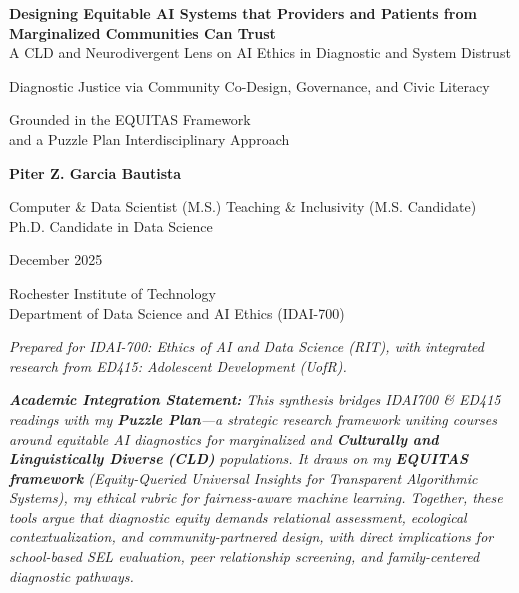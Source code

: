\documentclass[12pt,a4paper]{article}
\begin{document}
\begin{titlepage}
\centering
\vspace*{2.5cm}


{\Large \textbf{Designing Equitable AI Systems that Providers and Patients from Marginalized Communities Can Trust}}\\
{\normalsize A CLD and Neurodivergent Lens on AI Ethics in Diagnostic and System Distrust}


\vspace{1.6cm}

{\large Diagnostic Justice via Community Co-Design, Governance, and Civic Literacy}

\vspace{1.6cm}


{\normalsize Grounded in the EQUITAS Framework \\ and a Puzzle Plan Interdisciplinary Approach}


\vspace{2.4cm}


{\large \textbf{Piter Z. Garcia Bautista} \par}
{\large Computer \texorpdfstring{\&}{and} Data Scientist (M.S.) \textbullet{} Teaching \texorpdfstring{\&}{and} Inclusivity (M.S. Candidate) \textbullet{} Ph.D. Candidate in Data Science}


\vspace{0.3cm}


{\normalsize December 2025}


\vspace{2.5cm}


{\small Rochester Institute of Technology \\ Department of Data Science and AI Ethics (IDAI-700)}


\vfill

{
\scriptsize \textit{Prepared for IDAI-700: Ethics of AI and Data Science (RIT), with integrated research from ED415: Adolescent Development (UofR).} \\

\vspace{0.3cm}

\textit{\tiny\textbf{Academic Integration Statement:} This synthesis bridges IDAI700 \texorpdfstring{\&}{and} ED415 readings with my \textbf{Puzzle Plan}—a strategic research framework uniting courses around equitable AI diagnostics for marginalized and \textbf{\textit{Culturally and Linguistically Diverse}} \textbf{(CLD)} populations. It draws on my \textbf{EQUITAS framework} \textit{(Equity-Queried Universal Insights for Transparent Algorithmic Systems)}, my ethical rubric for fairness-aware machine learning. Together, these tools argue that \emph{diagnostic equity demands relational assessment, ecological contextualization, and community-partnered design}, with direct implications for school-based SEL evaluation, peer relationship screening, and family-centered diagnostic pathways.}

}

\end{titlepage}
\end{document}
